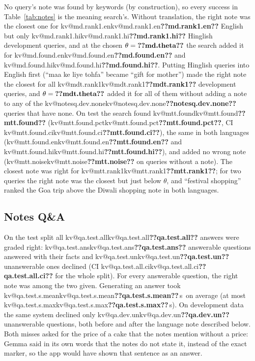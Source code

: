 \documentclass[11pt,a4paper]{article}
\makeatletter
\DeclareRobustCommand{\kv}[1]{\ifcsname kv@#1\endcsname\csname kv@#1\endcsname\else\textbf{??#1??}\fi}
\newcommand{\s}{\,s}
\makeatother
\begin{document}
\begin{table}[t]
\centering\small
\caption{Retrieval by meaning on Kestrel-NotesQ-v0. Every query's note is missed by the keyword search. ``Right note
added'': the closest note is the query's note and reaches $\theta$. The test split was run once, with $\theta$ from
development.}
\label{tab:notes}
\resizebox{\textwidth}{!}{}
\end{table}

No query's note was found by keywords (by construction), so every success in Table~\ref{tab:notes} is the meaning
search's. Without translation, the right note was the closest one for \kv{md.rank1.en} English but only
\kv{md.rank1.hi} Hinglish development queries, and at the chosen $\theta=\kv{md.theta}$ the search added it for
\kv{md.found.en} and \kv{md.found.hi}. Putting Hinglish queries into English first (``maa ke liye tohfa'' became ``gift
for mother'') made the right note the closest for all \kv{mdt.rank1} development queries, and $\theta=\kv{mdt.theta}$
added it for all of them without adding a note to any of the \kv{notesq.dev.none} queries that have none. On test the
search found \kv{mtt.found} (\kv{mtt.found.pct}, CI \kv{mtt.found.ci}), the same in both languages
(\kv{mtt.found.en} and \kv{mtt.found.hi}), and added no wrong note (\kv{mtt.noise} on queries without a note). The
closest note was right for \kv{mtt.rank1}; for two queries the right note was the closest but just below $\theta$, and ``festival shopping''
ranked the Goa trip above the Diwali shopping note in both languages.

\subsection{Notes Q\&A}

On the test split all \kv{qa.test.all} answers were graded right: \kv{qa.test.ans} answerable questions answered with
their facts and \kv{qa.test.un} unanswerable ones declined (CI \kv{qa.test.all.ci} for the whole split). For every answerable question,
the right note was among the two given. Generating an answer took \kv{qa.test.s.mean}\s\ on average (at most \kv{qa.test.s.max}\s). On development data the same system declined only
\kv{qa.dev.un} unanswerable questions, both before and after the language note described below. Both misses
asked for the price of a cake that the notes mention without a price: Gemma said in its own words that the notes do not
state it, instead of the exact marker, so the app would have shown that sentence as an answer.
\end{document}
